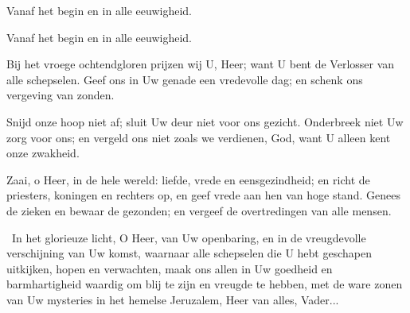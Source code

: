 \documentclass[12pt,twoside,a5paper]{article}
\begin{document}
\begin{doublecols}
  \textsizexi

  \dutchl Vanaf het begin en in alle eeuwigheid.

   Vanaf het begin en in alle eeuwigheid.

  \dutchl Bij het vroege ochtendgloren prijzen wij U, Heer; want U bent de Verlosser van alle schepselen. Geef ons in Uw genade een vredevolle dag; en schenk ons vergeving van zonden.


  \dutchl
  Snijd onze hoop niet af; sluit Uw deur niet voor ons gezicht. Onderbreek niet Uw zorg voor ons; en vergeld ons niet zoals we verdienen, God, want U alleen kent onze zwakheid.


  \dutchl
  Zaai, o Heer, in de hele wereld: liefde, vrede en eensgezindheid; en richt de priesters, koningen en rechters op, en geef vrede aan hen van hoge stand. Genees de zieken en bewaar de gezonden; en vergeef de overtredingen van alle mensen.

\end{doublecols}

\begin{halfparskip}
  \cc~In het glorieuze licht, O Heer, van Uw openbaring, en in de vreugdevolle verschijning van Uw komst, waarnaar alle schepselen die U hebt geschapen uitkijken, hopen en verwachten, maak ons allen in Uw goedheid en barmhartigheid waardig om blij te zijn en vreugde te hebben, met de ware zonen van Uw mysteries in het hemelse Jeruzalem, Heer van alles, Vader...
\end{halfparskip}
\end{document}
